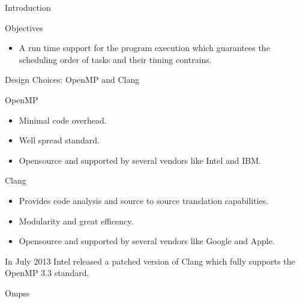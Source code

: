\documentclass[xcolor=dvipsnames]{beamer}
\begin{document}
\begin{section}{Introduction}
\begin{frame}{\hskip 0.3cm Objectives}
\begin{itemize}
\item A run time support for the program execution which guarantees the scheduling order of tasks and their timing contrains.

\end{itemize}



\end{frame}











\begin{frame}{\hskip 0.3cm Design Choices: OpenMP and Clang}


OpenMP 

\begin{itemize}

\item Minimal code overhead.

\item Well spread standard.

\item Opensource and supported by several vendors like Intel and IBM.

\end{itemize}

Clang

\begin{itemize}

\item Provides code analysis and source to source translation capabilities.

\item Modularity and great efficency.

\item Opensource and supported by several vendors like Google and Apple.

\end{itemize}
In July 2013 Intel released a patched version of Clang which fully supports the OpenMP 3.3 standard. 

\end{frame}










\begin{frame}{\hskip 0.3cm Ompss}

\end{frame}














\end{section}
\end{document}
